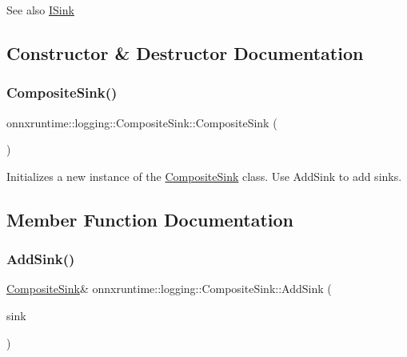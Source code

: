 \begin{DoxySeeAlso}{See also}
\mbox{\hyperlink{classonnxruntime_1_1logging_1_1ISink}{I\+Sink}}


\end{DoxySeeAlso}


\subsection{Constructor \& Destructor Documentation}
\mbox{\label{classonnxruntime_1_1logging_1_1CompositeSink_a58da6e015bd64ab5ac42fa001066c0a0}} 
\subsubsection{\texorpdfstring{Composite\+Sink()}{CompositeSink()}}
{\footnotesize\ttfamily onnxruntime\+::logging\+::\+Composite\+Sink\+::\+Composite\+Sink (\begin{DoxyParamCaption}{ }\end{DoxyParamCaption})\hspace{0.3cm}{\ttfamily [inline]}}



Initializes a new instance of the \mbox{\hyperlink{classonnxruntime_1_1logging_1_1CompositeSink}{Composite\+Sink}} class. Use Add\+Sink to add sinks. 



\subsection{Member Function Documentation}
\mbox{\label{classonnxruntime_1_1logging_1_1CompositeSink_ac3f7252d42270a2e837c6f7bb8ddd4af}} 
\subsubsection{\texorpdfstring{Add\+Sink()}{AddSink()}}
{\footnotesize\ttfamily \mbox{\hyperlink{classonnxruntime_1_1logging_1_1CompositeSink}{Composite\+Sink}}\& onnxruntime\+::logging\+::\+Composite\+Sink\+::\+Add\+Sink (\begin{DoxyParamCaption}\item[{std\+::unique\+\_\+ptr$<$ \mbox{\hyperlink{classonnxruntime_1_1logging_1_1ISink}{I\+Sink}} $>$}]{sink }\end{DoxyParamCaption})\hspace{0.3cm}{\ttfamily [inline]}}



